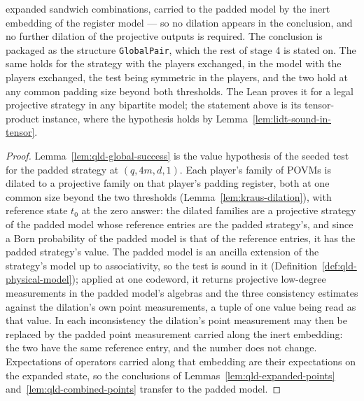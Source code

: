 \begin{lemma}
expanded sandwich combinations, carried to the padded model by the inert embedding of the
register model --- so no dilation appears in the conclusion, and no further dilation of the
projective outputs is required. The conclusion is packaged as the structure \texttt{GlobalPair},
which the rest of stage 4 is stated on. The same holds for the strategy with the players
exchanged, in the model with the players exchanged, the test being symmetric in the players, and
the two hold at any common padding size beyond both thresholds. The Lean proves it for a legal
projective strategy in any bipartite model; the statement above is its tensor-product instance,
where the hypothesis holds by Lemma~\ref{lem:lidt-sound-in-tensor}.
\end{lemma}

\begin{proof}
\leanok
Lemma~\ref{lem:qld-global-success} is the value hypothesis of the seeded test for the padded
strategy at $(q, 4m, d, 1)$. Each player's family of POVMs is dilated to a projective family on that
player's padding register, both at one common size beyond the two thresholds
(Lemma~\ref{lem:kraus-dilation}), with reference state $t_0$ at the zero answer: the dilated
families are a projective strategy of the padded model whose reference entries are the padded
strategy's, and since a Born probability of the padded model is that of the reference entries, it
has the padded strategy's value. The padded model is an ancilla extension of the strategy's model up
to associativity, so the test is sound in it (Definition~\ref{def:qld-physical-model}); applied at
one codeword, it returns projective low-degree measurements in the padded model's algebras and the
three consistency estimates against the dilation's own point measurements, a tuple of one value
being read as that value. In each inconsistency the dilation's point measurement may then be
replaced by the padded point measurement carried along the inert embedding: the two have the same
reference entry, and the number does not change. Expectations of operators carried along that
embedding are their expectations on the expanded state, so the conclusions of
Lemmas~\ref{lem:qld-expanded-points} and~\ref{lem:qld-combined-points} transfer to the padded model.
\end{proof}

